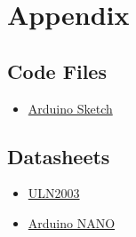 \documentclass[12pt,a4paper]{article}
\begin{document}
\section*{Appendix}


\subsection*{Code Files}
\begin{itemize}
  \item \href{https://drive.google.com/drive/folders/18NrzdcTJGfZFWStb0k2ivs41fUbuqQW8?usp=drive_link}{Arduino Sketch}
\end{itemize}
\vspace{-2mm}



\subsection*{Datasheets}
\begin{itemize}
  \item \href{https://drive.google.com/drive/folders/1ehxPydzgNhIfgLCbERb8SDw7-o424vQl?usp=drive_link}{ULN2003}
  \end{itemize}
  \begin{itemize}
  \item \href{https://docs.arduino.cc/hardware/nano/}{Arduino NANO}
  \end{itemize}
\end{document}

